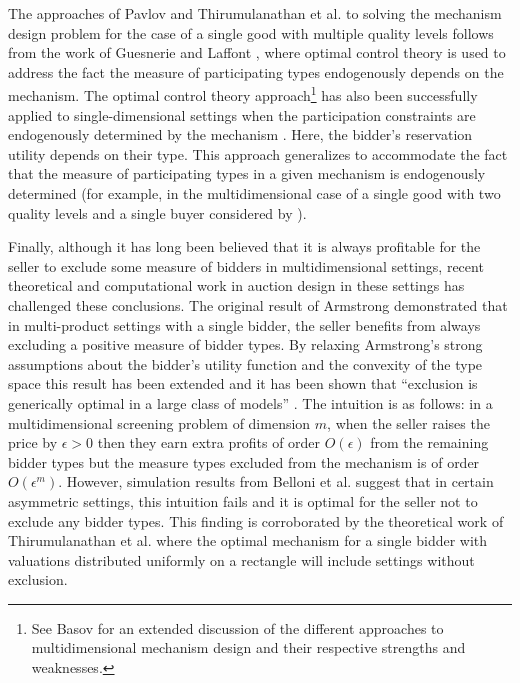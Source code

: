 The approaches of Pavlov \autocite*{pavlov2011optimal} and Thirumulanathan et al. \autocite*{thirumulanathan2019unitdemand} to solving the mechanism design problem for the case of a single good with multiple quality levels follows from the work of Guesnerie and Laffont \autocite*{guesnerie1984complete}, where optimal control theory is used to address the fact the measure of participating types endogenously depends on the mechanism. The optimal control theory approach\footnote{See Basov \autocite*[\S 7]{basov2005multidimensional} for an extended discussion of the different approaches to multidimensional mechanism design and their respective strengths and weaknesses.} has also been successfully applied to single-dimensional settings when the participation constraints are endogenously determined by the mechanism \autocite{jullien2000}. Here, the bidder's reservation utility depends on their type. This approach generalizes to accommodate the fact that the measure of participating types in a given mechanism is endogenously determined (for example, in the multidimensional case of a single good with two quality levels and a single buyer considered by \cite{pavlov2011optimal,thirumulanathan2019unitdemand}).

Finally, although it has long been believed that it is always profitable for the seller to exclude some measure of bidders \autocite{rochet1998ironing,armstrong1996multiproduct} in multidimensional settings, recent theoretical and computational work in auction design in these settings has challenged these conclusions. The original result of Armstrong \autocite*{armstrong1996multiproduct} demonstrated that in multi-product settings with a single bidder, the seller benefits from always excluding a positive measure of bidder types. By relaxing Armstrong's strong assumptions about the bidder's utility function and the convexity of the type space this result has been extended and it has been shown that ``exclusion is generically optimal in a large class of models'' \autocite[75]{barelli2014exclusion}. The intuition is as follows: in a multidimensional screening problem of dimension $m$, when the seller raises the price by $\epsilon>0$ then they earn extra profits of order $O(\epsilon)$ from the remaining bidder types but the measure types excluded from the mechanism is of order $O(\epsilon^m)$. However, simulation results from Belloni et al. \autocite*{belloni2010multidimensional} suggest that in certain asymmetric settings, this intuition fails and it is optimal for the seller not to exclude any bidder types. This finding is corroborated by the theoretical work of Thirumulanathan et al. \autocite*{thirumulanathan2019unitdemand} where the optimal mechanism for a single bidder with valuations distributed uniformly on a rectangle will include settings without exclusion.

